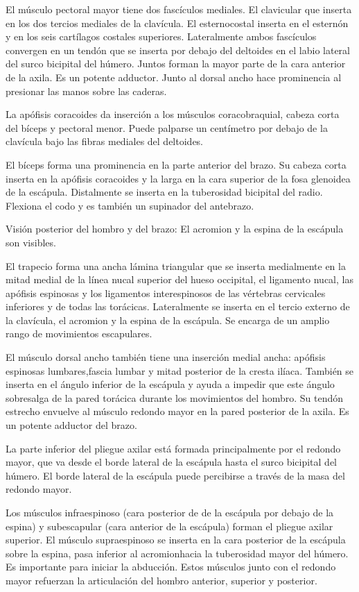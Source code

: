 \documentclass[a4paper,12pt]{article} %
\begin{document}
El músculo pectoral mayor tiene dos fascículos mediales. El clavicular que inserta en los dos tercios mediales de la clavícula. El esternocostal inserta en el esternón y en los seis cartílagos costales superiores. Lateralmente ambos fascículos convergen en un tendón  que se inserta por debajo del deltoides en el labio lateral del surco bicipital del húmero. Juntos forman la mayor parte de la cara anterior de la axila. Es un potente adductor. Junto al dorsal ancho hace prominencia al presionar las manos sobre las caderas.

La apófisis coracoides da inserción a los músculos coracobraquial, cabeza corta del bíceps y pectoral menor. Puede palparse un centímetro por debajo de la clavícula bajo las fibras mediales del deltoides.

El bíceps forma una prominencia en la parte anterior del brazo. Su cabeza corta inserta en la apófisis coracoides y la larga en la cara superior de la fosa glenoidea de la escápula. Distalmente se inserta en la tuberosidad bicipital del radio. Flexiona el codo y es también un supinador del antebrazo.

Visión posterior del hombro y del brazo: El acromion y la espina de la escápula son visibles.

El trapecio forma una ancha lámina triangular que se inserta medialmente en la mitad medial de la línea nucal superior del hueso occipital, el ligamento nucal, las apófisis espinosas y los ligamentos interespinosos de las vértebras cervicales inferiores y de todas las torácicas. Lateralmente se inserta en el tercio externo de la clavícula, el acromion y la espina de la escápula. Se encarga de un amplio rango de movimientos escapulares.

El músculo dorsal ancho también tiene una inserción medial ancha: apófisis espinosas lumbares,fascia lumbar y mitad posterior de la cresta ilíaca. También se inserta en el ángulo inferior de la escápula y ayuda a impedir que este ángulo sobresalga de la pared torácica durante los movimientos del hombro. Su tendón estrecho envuelve al músculo redondo mayor en la pared posterior de la axila. Es un potente adductor del brazo.

La parte inferior del pliegue axilar está formada principalmente por el redondo mayor, que va desde el borde lateral de la escápula hasta el surco bicipital del húmero. El borde lateral de la escápula puede percibirse a través de la masa del redondo mayor.

Los músculos infraespinoso (cara posterior de de la escápula por debajo de la espina) y subescapular (cara anterior de la escápula) forman el pliegue axilar superior. El músculo supraespinoso se inserta en la cara posterior de la escápula sobre la espina, pasa inferior al acromionhacia la tuberosidad mayor del húmero. Es importante para iniciar la abducción. Estos músculos junto con el redondo mayor refuerzan la articulación del hombro anterior, superior y posterior.
\end{document}
